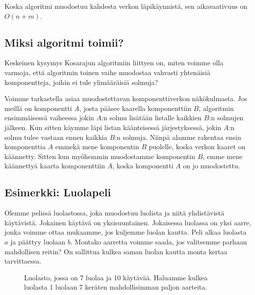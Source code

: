 Koska algoritmi muodostuu kahdesta verkon läpikäynnistä,
sen aikavaativuus on $O(n+m)$.

\subsection{Miksi algoritmi toimii?}

Keskeinen kysymys Kosarajun algoritmiin liittyen on,
miten voimme olla varmoja, että algoritmin toinen vaihe
muodostaa vahvasti yhtenäisiä komponentteja,
joihin ei tule ylimääräisiä solmuja?

Voimme tarkastella asiaa muodostettavan
komponenttiverkon näkökul\-masta.
Jos meillä on komponentti $A$, josta pääsee kaarella
komponenttiin $B$, 
algoritmin ensimmäisessä vaiheessa
jokin $A$:n solmu lisätään listalle kaikkien $B$:n
solmujen jälkeen.
Kun sitten käymme läpi listan käänteisessä järjestyk\-sessä,
jokin $A$:n solmu tulee vastaan ennen kaikkia $B$:n
solmuja.
Niinpä alamme rakentaa ensin komponenttia $A$
emmekä mene komponentin $B$ puolelle,
koska verkon kaaret on käännetty.
Sitten kun myöhemmin muodostamme komponentin $B$,
emme mene käännettyä kaarta komponenttiin $A$,
koska komponentti $A$ on jo muodostettu.

\subsection{Esimerkki: Luolapeli}

Olemme pelissä luolastossa, joka muodostuu luolista ja niitä yhdistävistä
käytävistä. Jokainen käytävä on yksisuuntainen.
Jokaisessa luolassa on yksi aarre, jonka voimme ottaa mukaamme,
jos kuljemme luolan kautta.
Peli alkaa luolasta $a$ ja päättyy luolaan $b$.
Montako aarretta voimme saada, jos valitsemme parhaan
mahdollisen reitin?
On sallittua kulkea saman luolan kautta monta kertaa tarvittaessa.

\begin{figure}
\center
\begin{center}
\end{center}
\caption{Luolasto, jossa on 7 luolaa ja 10 käytävää.
Haluamme kulkea luolasta 1 luolaan 7 keräten mahdollisimman paljon aarteita.}
\label{fig:luopel}
\end{figure}

